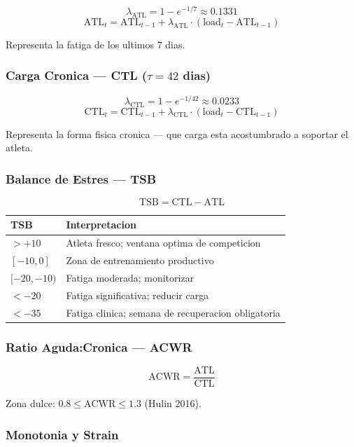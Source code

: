\documentclass[12pt, a4paper]{article}
\begin{document}
\[
  \lambda_{\text{ATL}} = 1 - e^{-1/7} \approx 0.1331
\]
\[
  \text{ATL}_{t} = \text{ATL}_{t-1} + \lambda_{\text{ATL}} \cdot
  (\text{load}_{t} - \text{ATL}_{t-1})
\]

Representa la fatiga de los ultimos 7 dias.

\subsubsection{Carga Cronica --- CTL ($\tau = 42$ dias)}

\[
  \lambda_{\text{CTL}} = 1 - e^{-1/42} \approx 0.0233
\]
\[
  \text{CTL}_{t} = \text{CTL}_{t-1} + \lambda_{\text{CTL}} \cdot
  (\text{load}_{t} - \text{CTL}_{t-1})
\]

Representa la forma fisica cronica --- que carga esta acostumbrado a soportar el atleta.

\subsubsection{Balance de Estres --- TSB}

\[
  \text{TSB} = \text{CTL} - \text{ATL}
\]

\begin{center}
\begin{tabular}{ll}
\toprule
TSB & Interpretacion \\
\midrule
$> +10$       & Atleta fresco; ventana optima de competicion \\
$[-10, 0]$    & Zona de entrenamiento productivo \\
$[-20, -10)$  & Fatiga moderada; monitorizar \\
$< -20$       & Fatiga significativa; reducir carga \\
$< -35$       & Fatiga clinica; semana de recuperacion obligatoria \\
\bottomrule
\end{tabular}
\end{center}

\subsubsection{Ratio Aguda:Cronica --- ACWR}

\[
  \text{ACWR} = \frac{\text{ATL}}{\text{CTL}}
\]

Zona dulce: $0.8 \leq \text{ACWR} \leq 1.3$ (Hulin 2016).

\subsubsection{Monotonia y Strain}
\end{document}
